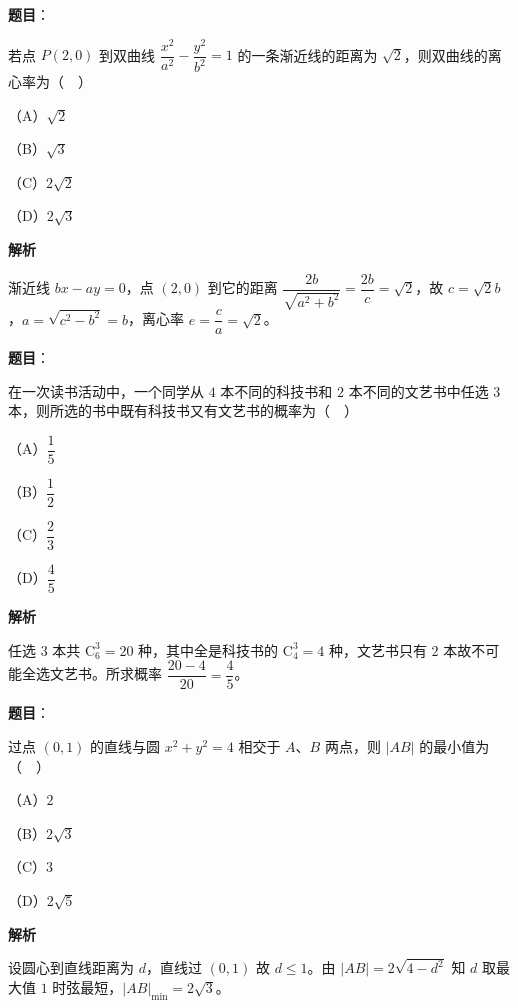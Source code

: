 \begin{answer}

\textbf{题目}：

若点 $P(2,0)$ 到双曲线 $\dfrac{x^2}{a^2}-\dfrac{y^2}{b^2}=1$ 的一条渐近线的距离为 $\sqrt2$，则双曲线的离心率为（　）

（A）$\sqrt2$

（B）$\sqrt3$

（C）$2\sqrt2$

（D）$2\sqrt3$

\textbf{解析}

渐近线 $bx-ay=0$，点 $(2,0)$ 到它的距离 $\dfrac{2b}{\sqrt{a^2+b^2}}=\dfrac{2b}c=\sqrt2$，故 $c=\sqrt2b$，$a=\sqrt{c^2-b^2}=b$，离心率 $e=\dfrac ca=\sqrt2$。


\end{answer}
\begin{answer}

\textbf{题目}：

在一次读书活动中，一个同学从 $4$ 本不同的科技书和 $2$ 本不同的文艺书中任选 $3$ 本，则所选的书中既有科技书又有文艺书的概率为（　）

（A）$\dfrac15$

（B）$\dfrac12$

（C）$\dfrac23$

（D）$\dfrac45$

\textbf{解析}

任选 $3$ 本共 $\mathrm C_6^3=20$ 种，其中全是科技书的 $\mathrm C_4^3=4$ 种，文艺书只有 $2$ 本故不可能全选文艺书。所求概率 $\dfrac{20-4}{20}=\dfrac45$。


\end{answer}
\begin{answer}

\textbf{题目}：

过点 $(0,1)$ 的直线与圆 $x^2+y^2=4$ 相交于 $A$、$B$ 两点，则 $|AB|$ 的最小值为（　）

（A）$2$

（B）$2\sqrt3$

（C）$3$

（D）$2\sqrt5$

\textbf{解析}

设圆心到直线距离为 $d$，直线过 $(0,1)$ 故 $d\leqslant1$。由 $|AB|=2\sqrt{4-d^2}$ 知 $d$ 取最大值 $1$ 时弦最短，$|AB|_{\min}=2\sqrt3$。


\end{answer}
